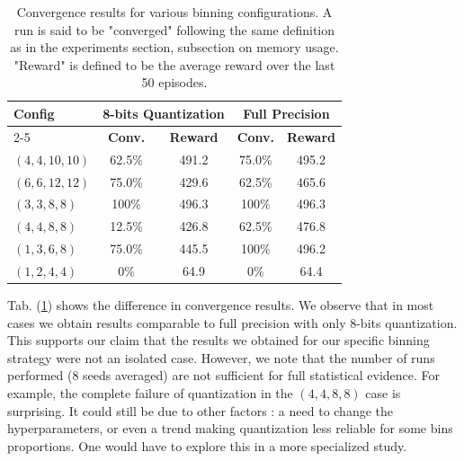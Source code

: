 \documentclass[10pt,conference,compsocconf]{IEEEtran}
\begin{document}
        \begin{table}[]
        \centering
        \begin{tabular}{|l|cc|cc|}
        \hline
        \multirow{2}{*}{\textbf{Config}} & \multicolumn{2}{c|}{\textbf{8-bits Quantization}} & \multicolumn{2}{c|}{\textbf{Full Precision}} \\ \cline{2-5} 
                                         & \textbf{Conv.}   & \textbf{Reward}  & \textbf{Conv.}       & \textbf{Reward}       \\ \hline
        $(4,4,10,10)$                    & 62.5\%           & 491.2            & 75.0\%               & 495.2                 \\
        $(6,6,12,12)$                    & 75.0\%           & 429.6            & 62.5\%               & 465.6                 \\
        $(3,3,8,8)$                      & 100\%            & 496.3            & 100\%                & 496.3                 \\
        $(4,4,8,8)$                      & 12.5\%           & 426.8            & 62.5\%               & 476.8                 \\
        $(1,3,6,8)$                      & 75.0\%           & 445.5            & 100\%                & 496.2                 \\
        $(1,2,4,4)$                      & 0\%              & 64.9             & 0\%                  & 64.4                  \\ \hline
        \end{tabular}
        \caption{Convergence results for various binning configurations. A run is said to be "converged" following the same definition as in the experiments section, subsection on memory usage. "Reward" is defined to be the average reward over the last 50 episodes.}
        \label{tab:other_bins}
        \end{table}
        
        Tab. (\ref{tab:other_bins}) shows the difference in convergence results. We observe that in most cases we obtain results comparable to full precision with only 8-bits quantization. This supports our claim that the results we obtained for our specific binning strategy were not an isolated case. However, we note that the number of runs performed (8 seeds averaged) are not sufficient for full statistical evidence. For example, the complete failure of quantization in the $(4, 4, 8, 8)$ case is surprising. It could still be due to other factors : a need to change the hyperparameters, or even a trend making quantization less reliable for some bins proportions. One would have to explore this in a more specialized study.

\newpage


\end{document}
